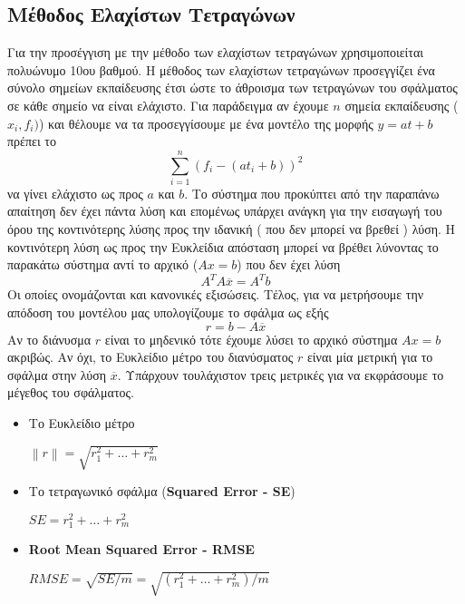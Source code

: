 \documentclass[Second Project.tex]{subfiles}
\newcommand{\norm}[1]{\left\lVert#1\right\rVert}
\begin{document}
\subsection{ Μέθοδος Ελαχίστων Τετραγώνων }

Για την προσέγγιση με την μέθοδο των ελαχίστων τετραγώνων χρησιμοποιείται πολυώνυμο 10ου βαθμού. Η μέθοδος των 
ελαχίστων τετραγώνων προσεγγίζει ένα σύνολο σημείων εκπαίδευσης έτσι ώστε το άθροισμα των τετραγώνων του σφάλματος
σε κάθε σημείο να είναι ελάχιστο. Για παράδειγμα αν έχουμε $n$ σημεία εκπαίδευσης ($x_{i}, f_{i})$) και θέλουμε να τα
προσεγγίσουμε με ένα μοντέλο της μορφής $y = at + b$ πρέπει το 
\begin{equation*}
    \sum_{i=1}^{n} (f_{i} - ( at_{i} + b))^{2}
\end{equation*}
να γίνει ελάχιστο ως προς $a$ και $b$. Το σύστημα που προκύπτει από την παραπάνω απαίτηση δεν έχει πάντα λύση και 
επομένως υπάρχει ανάγκη για την εισαγωγή του όρου της κοντινότερης λύσης προς την ιδανική ( που δεν μπορεί να βρεθεί )
 λύση. Η κοντινότερη λύση ως προς την Ευκλείδια απόσταση μπορεί να βρέθει λύνοντας το παρακάτω σύστημα αντί το αρχικό
($Ax = b$) που δεν έχει λύση
\begin{equation*}
    A^{T}A\overline{x} = A^{T}b
\end{equation*}
Οι οποίες ονομάζονται και κανονικές εξισώσεις. Τέλος, για να μετρήσουμε την απόδοση του μοντέλου μας υπολογίζουμε το 
σφάλμα ως εξής 
\begin{equation*}
    r = b - A\overline{x}
\end{equation*}
Αν το διάνυσμα $r$ είναι το μηδενικό τότε έχουμε λύσει το αρχικό σύστημα $Ax = b$ ακριβώς. Αν όχι, το Ευκλείδιο μέτρο
του διανύσματος $r$ είναι μία μετρική για το σφάλμα στην λύση $\overline{x}$. Υπάρχουν τουλάχιστον τρεις μετρικές 
για να εκφράσουμε το μέγεθος του σφάλματος.
\newpage
\begin{itemize}
    \item Το Ευκλείδιο μέτρο
        \begin{center}
            $\norm{r} = \sqrt{r_{1}^{2} + \dots + r_{m}^{2}}$
        \end{center}
    \item Το τετραγωνικό σφάλμα (\textlatin{\textbf{Squared Error - SE}})
        \begin{center}
            $SE = r_{1}^2 + \dots + r_{m}^2$
        \end{center}
    \item \textlatin{\textbf{Root Mean Squared Error - RMSE}}
        \begin{center}
            $RMSE = \sqrt{SE/m} = \sqrt{(r_{1}^2 + \dots + r_{m}^2)/m}$
        \end{center}
\end{itemize}
\end{document}
